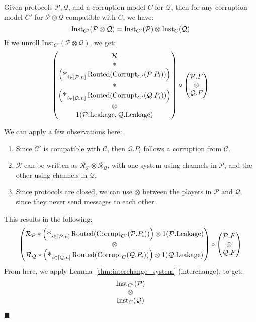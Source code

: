 \begin{theorem}
  \label{thm:concurrent_breakdown}
  Given protocols $\mathcal{P}, \mathcal{Q}$, and a corruption model $C$
  for $\mathcal{Q}$, then for any corruption model $C'$ for $\mathcal{P} \otimes \mathcal{Q}$ compatible with $C$, we have:
  \[
    \text{Inst}_{C'}(\mathcal{P} \otimes \mathcal{Q}) = \text{Inst}_{C'}(\mathcal{P}) \otimes \text{Inst}_C(\mathcal{Q})
  \]
 If we unroll $\text{Inst}_{C'}(\mathcal{P} \otimes \mathcal{Q})$, we get:
$$
\begin{pmatrix}
\mathcal{R}\cr
*\cr
\left(\bigast_{i \in [\mathcal{P}.n]} \tx{Routed}(\tx{Corrupt}_{C'}(\mathcal{P}.P_i))\right)\cr
*\cr
\left(\bigast_{i \in [\mathcal{Q}.n]} \tx{Routed}(\tx{Corrupt}_{C'}(\mathcal{Q}.P_i))\right)\cr
\otimes\cr
1(\mathcal{P}.\tx{Leakage}, \mathcal{Q}.\tx{Leakage})
\end{pmatrix}
\circ
\begin{pmatrix}
\mathcal{P}.F\cr
\otimes\cr
\mathcal{Q}.F\cr
\end{pmatrix}
$$

We can apply a few observations here:
\begin{enumerate}
  \item Since $\mathcal{C}'$ is compatible with $\mathcal{C}$, then $\mathcal{Q}.P_i$ follows a corruption from $\mathcal{C}$.
  \item $\mathcal{R}$ can be written as $\mathcal{R}_\mathcal{P} \otimes \mathcal{R}_\mathcal{Q}$,
  with one system using channels in $\mathcal{P}$, and the other using channels in $\mathcal{Q}$.
  \item Since protocols are closed, we can use $\otimes$ between the players in $\mathcal{P}$ and $\mathcal{Q}$,
  since they never send messages to each other.
\end{enumerate}
This results in the following:
$$
\begin{pmatrix}
  \mathcal{R}_{\mathcal{P}} * \left(\bigast_{i \in [\mathcal{P}.n]} \tx{Routed}(\tx{Corrupt}_{C'}(\mathcal{P}.P_i))\right) \otimes 1(\mathcal{P}.\tx{Leakage})\cr
\otimes\cr
  \mathcal{R}_{\mathcal{Q}} * \left(\bigast_{i \in [\mathcal{Q}.n]} \tx{Routed}(\tx{Corrupt}_{C}(\mathcal{Q}.P_i))\right) \otimes 1(\mathcal{Q}.\tx{Leakage})
\end{pmatrix}
\circ
\begin{pmatrix}
\mathcal{P}.F\cr
\otimes\cr
\mathcal{Q}.F\cr
\end{pmatrix}
$$
From here, we apply Lemma~\ref{thm:interchange_system} (interchange), to get:
$$
\begin{matrix}
\text{Inst}_{C'}(\mathcal{P})\cr
\otimes\cr
\text{Inst}_{C}(\mathcal{Q})\cr
\end{matrix}
$$

$\blacksquare$

\end{theorem}

